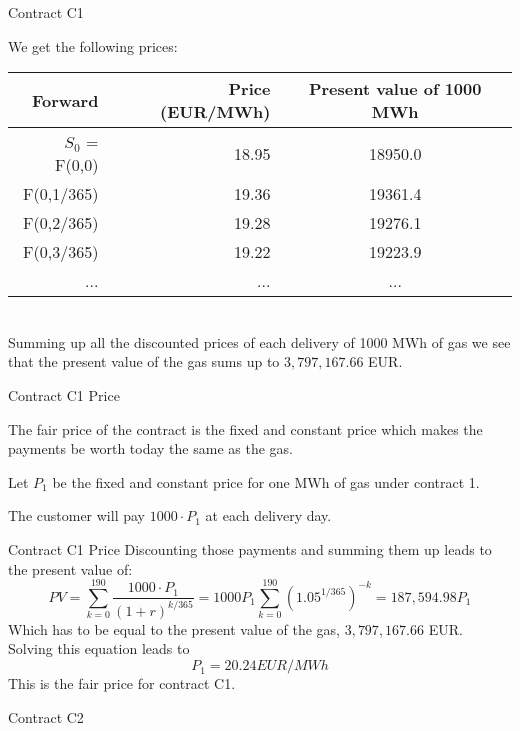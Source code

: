 {Contract C1}

We get the following prices:
\begin{tabular}{rrc}
   Forward &      Price (EUR/MWh)& Present value of 1000 MWh \\
\hline
$S_0$ = F(0,0) &         18.95 &      18950.0 \\

 F(0,1/365) &    19.36 &    19361.4 \\

 F(0,2/365) &    19.28 &    19276.1 \\

 F(0,3/365) &    19.22 &    19223.9 \\
...&...&...\\
\end{tabular}  \\
Summing up all the discounted prices of each delivery of 1000 MWh of gas we see that the present value of the gas sums up to $3,797,167.66$ EUR.

{Contract C1 Price}






	The fair price of the contract is the fixed and constant price which makes the payments be worth today the same as the gas.

	Let $P_1$ be the fixed and constant price for one MWh of gas under contract 1.

	The customer will pay $1000 \cdot P_1$ at each delivery day.






{Contract C1 Price}
Discounting those payments and summing them up leads to the present value of:
$$
	PV = \sum_{k=0}^{190}{\frac{1000 \cdot P_1}{(1 + r)^{k/365}}} = 1000 P_1 \sum_{k=0}^{190} (1.05^{1/365})^{-k} = 187,594.98 P_1
$$
Which has to be equal to the present value of the gas, $3,797,167.66$ EUR. Solving this equation leads to
$$
	P_1 = 20.24 EUR/MWh
$$
This is the fair price for contract C1.


{Contract C2}






